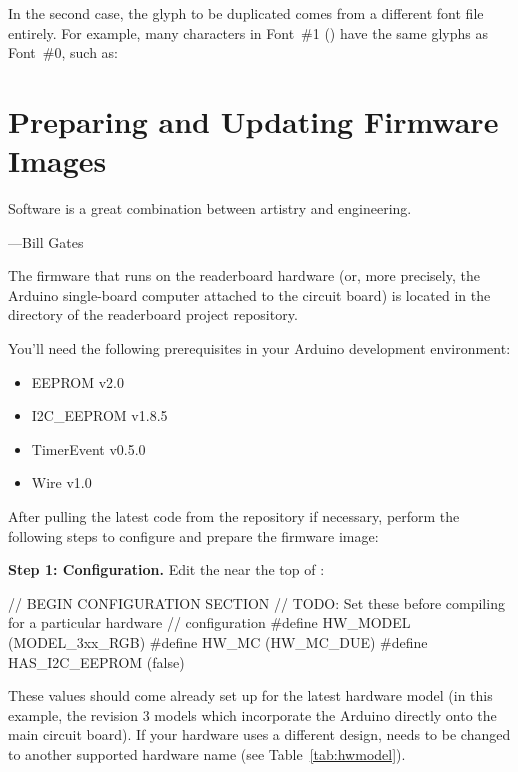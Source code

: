 In the second case, the glyph to be duplicated comes from a different font file entirely.
For example, many characters in Font~\#1 () have the same glyphs
as Font~\#0, such as:

%                                                     
\chapter{Preparing and Updating Firmware Images}\label{chap:firmware}
\epigraph{Software is a great combination between artistry and engineering.}{---Bill Gates}
The firmware that runs on the readerboard hardware (or, more precisely, the Arduino single-board
computer attached to the circuit board) is located in the  directory of the
readerboard project repository.

You'll need the following prerequisites in your Arduino development environment:
\begin{itemize}
	\item EEPROM v2.0
	\item I2C\_EEPROM v1.8.5
	\item TimerEvent v0.5.0
	\item Wire v1.0
\end{itemize}

After pulling the latest code from the repository if necessary, perform the following steps to configure and
prepare the firmware image:

{\bfseries Step 1: Configuration.}\label{config-fw}
Edit the  near the top of :
\begin{SourceCode}
// BEGIN CONFIGURATION SECTION
// TODO: Set these before compiling for a particular hardware 
//       configuration
#define HW_MODEL (MODEL_3xx_RGB)
#define HW_MC (HW_MC_DUE)
#define HAS_I2C_EEPROM (false)
\end{SourceCode}

These values should come already set up for the latest hardware model (in this example,
the revision 3  models which incorporate the Arduino directly onto
the main circuit board). If your hardware uses a different design, %
 needs to be changed to another supported hardware
name (see Table~\ref{tab:hwmodel}).


